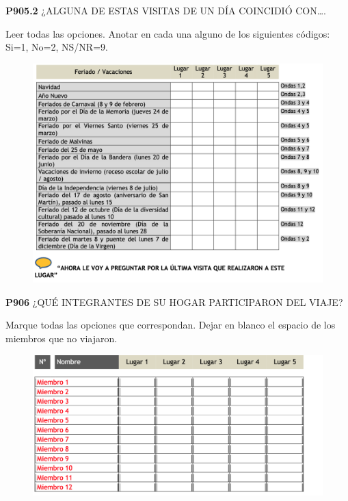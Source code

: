 \documentclass[
  openany]{book}
\begin{document}
\textbf{P905.2} ¿ALGUNA DE ESTAS VISITAS DE UN DÍA COINCIDIÓ CON\ldots.

Leer todas las opciones. Anotar en cada una alguno de los siguientes códigos: Si=1, No=2, NS/NR=9.

\begin{figure}

{\centering \includegraphics[width=1\linewidth]{imagenes/figura6-286} 

}

\end{figure}

\textbf{P906} ¿QUÉ INTEGRANTES DE SU HOGAR PARTICIPARON DEL VIAJE?

Marque todas las opciones que correspondan. Dejar en blanco el espacio de los miembros que no viajaron.

\begin{figure}

{\centering \includegraphics[width=1\linewidth]{imagenes/figura6-287} 

}

\end{figure}
\end{document}
